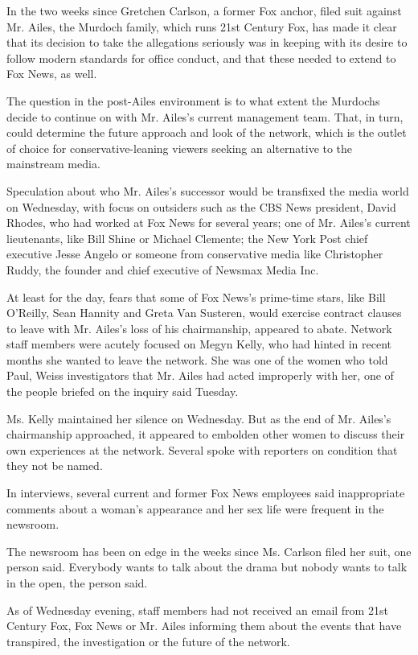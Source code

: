 In the two weeks since Gretchen Carlson, a former Fox anchor, filed suit
against Mr. Ailes, the Murdoch family, which runs 21st Century Fox, has
made it clear that its decision to take the allegations seriously was in
keeping with its desire to follow modern standards for office conduct,
and that these needed to extend to Fox News, as well.

The question in the post-Ailes environment is to what extent the
Murdochs decide to continue on with Mr. Ailes's current management team.
That, in turn, could determine the future approach and look of the
network, which is the outlet of choice for conservative-leaning viewers
seeking an alternative to the mainstream media.

Speculation about who Mr. Ailes's successor would be transfixed the
media world on Wednesday, with focus on outsiders such as the CBS News
president, David Rhodes, who had worked at Fox News for several years;
one of Mr. Ailes's current lieutenants, like Bill Shine or Michael
Clemente; the New York Post chief executive Jesse Angelo or someone from
conservative media like Christopher Ruddy, the founder and chief
executive of Newsmax Media Inc.

At least for the day, fears that some of Fox News's prime-time stars,
like Bill O'Reilly, Sean Hannity and Greta Van Susteren, would exercise
contract clauses to leave with Mr. Ailes's loss of his chairmanship,
appeared to abate. Network staff members were acutely focused on Megyn
Kelly, who had hinted in recent months she wanted to leave the network.
She was one of the women who told Paul, Weiss investigators that Mr.
Ailes had acted improperly with her, one of the people briefed on the
inquiry said Tuesday.

Ms. Kelly maintained her silence on Wednesday. But as the end of Mr.
Ailes's chairmanship approached, it appeared to embolden other women to
discuss their own experiences at the network. Several spoke with
reporters on condition that they not be named.

In interviews, several current and former Fox News employees said
inappropriate comments about a woman's appearance and her sex life were
frequent in the newsroom.

The newsroom has been on edge in the weeks since Ms. Carlson filed her
suit, one person said. Everybody wants to talk about the drama but
nobody wants to talk in the open, the person said.

As of Wednesday evening, staff members had not received an email from
21st Century Fox, Fox News or Mr. Ailes informing them about the events
that have transpired, the investigation or the future of the network.

